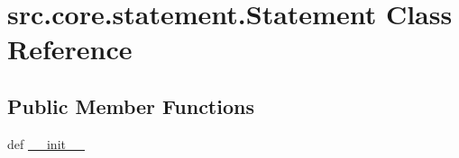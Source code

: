 \hypertarget{classsrc_1_1core_1_1statement_1_1_statement}{\section{src.\+core.\+statement.\+Statement Class Reference}
\label{classsrc_1_1core_1_1statement_1_1_statement}
}
\subsection*{Public Member Functions}
\begin{DoxyCompactItemize}
\item 
def \hyperlink{classsrc_1_1core_1_1statement_1_1_statement_abf2bda0e5f09d1f483ce7ab7d1eb9909}{\+\_\+\+\_\+init\+\_\+\+\_\+}
\end{DoxyCompactItemize}
